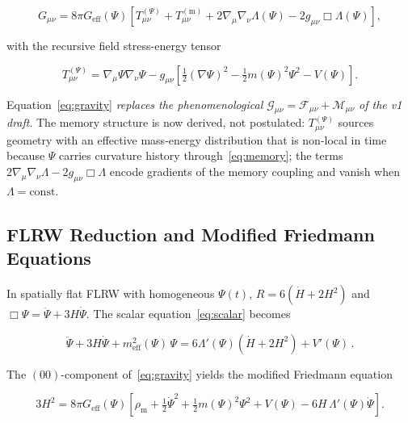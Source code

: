 \documentclass[12pt,a4paper]{article}
\begin{document}
\begin{equation}
\label{eq:gravity}
\boxed{
G_{\mu\nu} = 8\pi G_{\mathrm{eff}}(\Psi)
\!\left[
  T^{(\Psi)}_{\mu\nu} + T^{(\mathrm{m})}_{\mu\nu}
  + 2\nabla_\mu\nabla_\nu\Lambda(\Psi)
  - 2g_{\mu\nu}\Box\Lambda(\Psi)
\right],
}
\end{equation}

with the recursive field stress-energy tensor

\begin{equation}
\label{eq:Tpsi}
T^{(\Psi)}_{\mu\nu}
= \nabla_\mu\Psi\nabla_\nu\Psi
  - g_{\mu\nu}\!\left[
    \tfrac{1}{2}(\nabla\Psi)^2
    - \tfrac{1}{2}m(\Psi)^2\Psi^2 - V(\Psi)
  \right].
\end{equation}

Equation~\eqref{eq:gravity} \emph{replaces the phenomenological
$\mathcal{G}_{\mu\nu} = \mathcal{F}_{\mu\nu} + \mathcal{M}_{\mu\nu}$
of the v1 draft}. The memory structure is now derived, not postulated:
$T^{(\Psi)}_{\mu\nu}$ sources geometry with an effective mass-energy
distribution that is non-local in time because $\Psi$ carries curvature
history through~\eqref{eq:memory}; the terms
$2\nabla_\mu\nabla_\nu\Lambda - 2g_{\mu\nu}\Box\Lambda$ encode gradients
of the memory coupling and vanish when $\Lambda = \mathrm{const}$.

\subsection{FLRW Reduction and Modified Friedmann Equations}
\label{sec:flrw}

In spatially flat FLRW with homogeneous $\Psi(t)$,
$R = 6(\dot{H} + 2H^2)$ and $\Box\Psi = \ddot\Psi + 3H\dot\Psi$.
The scalar equation~\eqref{eq:scalar} becomes

\begin{equation}
\label{eq:flrw_scalar}
\ddot\Psi + 3H\dot\Psi + m_{\mathrm{eff}}^2(\Psi)\,\Psi
= 6\Lambda'(\Psi)\!\left(\dot{H} + 2H^2\right) + V'(\Psi)\,.
\end{equation}

The $(00)$-component of~\eqref{eq:gravity} yields the modified Friedmann equation

\begin{equation}
\label{eq:friedmann}
\boxed{
3H^2 = 8\pi G_{\mathrm{eff}}(\Psi)
\!\left[
  \rho_{\mathrm{m}}
  + \tfrac{1}{2}\dot\Psi^2
  + \tfrac{1}{2}m(\Psi)^2\Psi^2
  + V(\Psi)
  - 6H\,\Lambda'(\Psi)\dot\Psi
\right].
}
\end{equation}
\end{document}
